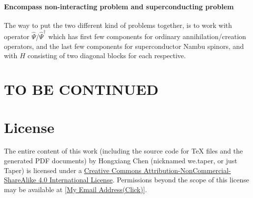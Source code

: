 \documentclass{article}
\begin{document}
\paragraph{Encompass non-interacting problem and superconducting
problem} The way to put the two different kind of problems together,
is to work with operator $\hat\Psi$/$\hat\Psi^\dagger$ which has first
few components for ordinary annihilation/creation operators, and the
last few components for superconductor Nambu spinors, and with
$H$ consisting of two diagonal blocks for each respective. 

\section{TO BE CONTINUED}

\section{License}
The entire content of this work (including the source code
for TeX files and the generated PDF documents) by 
Hongxiang Chen (nicknamed we.taper, or just Taper) is
licensed under a 
\href{http://creativecommons.org/licenses/by-nc-sa/4.0/}{Creative 
Commons Attribution-NonCommercial-ShareAlike 4.0 International 
License}. Permissions beyond the scope of this 
license may be available at 
\href{http://www.google.com/recaptcha/mailhide/d?k=015LguzBJigi0rpyuJRqLoig==\&c=p1c-M-mm7ZcjUCkTuZZa9eEPHRVk6paN0694iazlQy8=}
{[My Email Address(Click)]}.
{}

\printnomenclature
\end{document}
